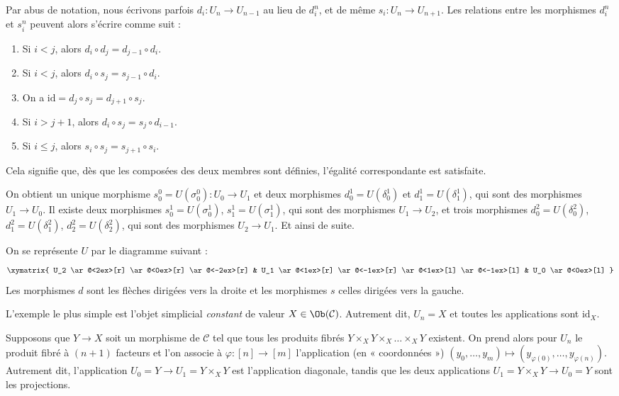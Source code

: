 \begin{remark}
\label{remark-relations}
Par abus de notation, nous écrivons parfois $d_i : U_n \to U_{n - 1}$
au lieu de $d^n_i$, et de même $s_i : U_n \to U_{n + 1}$.
Les relations entre les morphismes $d^n_i$ et $s^n_i$
peuvent alors s'écrire comme suit :
\begin{enumerate}
\item Si $i < j$, alors $d_i \circ d_j = d_{j - 1} \circ d_i$.
\item Si $i < j$, alors $d_i \circ s_j = s_{j - 1} \circ d_i$.
\item On a $\text{id} = d_j \circ s_j = d_{j + 1} \circ s_j$.
\item Si $i > j + 1$, alors $d_i \circ s_j = s_j \circ d_{i - 1}$.
\item Si $i \leq j$, alors $s_i \circ s_j = s_{j + 1} \circ s_i$.
\end{enumerate}
Cela signifie que, dès que les composées des deux membres sont définies,
l'égalité correspondante est satisfaite.
\end{remark}

\noindent
On obtient un unique morphisme $s^0_0 = U(\sigma^0_0) : U_0 \to U_1$ et
deux morphismes $d^1_0 = U(\delta^1_0)$ et
$d^1_1 = U(\delta^1_1)$, qui sont des morphismes $U_1 \to U_0$.
Il existe deux morphismes $s^1_0 = U(\sigma^1_0)$,
$s^1_1 = U(\sigma^1_1)$, qui sont des morphismes $U_1 \to U_2$,
et trois morphismes
$d^2_0 = U(\delta^2_0)$, $d^2_1 = U(\delta^2_1)$,
$d^2_2 = U(\delta^2_2)$, qui sont des morphismes $U_2 \to U_1$.
Et ainsi de suite.

\medskip\noindent
On se représente $U$ par le diagramme suivant :
$$
\xymatrix{
U_2
\ar@<2ex>[r]
\ar@<0ex>[r]
\ar@<-2ex>[r]
&
U_1
\ar@<1ex>[r]
\ar@<-1ex>[r]
\ar@<1ex>[l]
\ar@<-1ex>[l]
&
U_0
\ar@<0ex>[l]
}
$$
Les morphismes $d$ sont les flèches dirigées vers la droite et les
morphismes $s$ celles dirigées vers la gauche.

\begin{example}
\label{example-constant-simplicial-object}
L'exemple le plus simple est l'objet simplicial {\it constant} de valeur
$X \in \Ob(\mathcal{C})$. Autrement dit, $U_n = X$ et toutes les
applications sont $\text{id}_X$.
\end{example}

\begin{example}
\label{example-fibre-products-simplicial-object}
Supposons que $Y\to X$ soit un morphisme de $\mathcal{C}$ tel que tous les
produits fibrés $Y \times_X Y \times_X \ldots \times_X Y$ existent.
On prend alors pour $U_n$ le produit fibré à $(n + 1)$ facteurs et l'on
associe à $\varphi : [n] \to [m]$ l'application (en « coordonnées »)
$(y_0, \ldots, y_m) \mapsto (y_{\varphi(0)}, \ldots, y_{\varphi(n)})$.
Autrement dit, l'application $U_0 = Y \to U_1 = Y \times_X Y$ est
l'application diagonale, tandis que les deux applications
$U_1 = Y \times_X Y \to U_0 = Y$ sont les projections.
\end{example}

